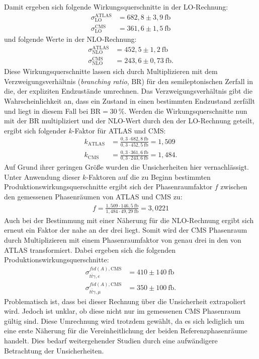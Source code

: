 Damit ergeben sich folgende Wirkungsquerschnitte in der LO-Rechnung:
\begin{align}
  \sigma^{\text{ATLAS}}_{\text{LO}} &= 682,8 \pm 3,9~ \si{\femto\barn}\\
  \sigma^{\text{CMS}}_{\text{LO}} &= 361,6 \pm 1,5~ \si{\femto\barn}
\end{align}
und folgende Werte in der NLO-Rechnung:
\begin{align}
  \sigma^{\text{ATLAS}}_{\text{NLO}} &= 452,5 \pm 1,2~ \si{\femto\barn}\\
  \sigma^{\text{CMS}}_{\text{NLO}} &= 243,6 \pm 0,73~ \si{\femto\barn}.
\end{align}
Diese Wirkungsquerschnitte lassen sich durch Multiplizieren mit dem Verzweigungsverhältnis (\textit{branching ratio}, $\mathrm{BR}$) für den semileptonischen Zerfall in die, der expliziten Endzustände umrechnen. Das Verzweigungsverhältnis gibt die Wahrscheinlichkeit an, dass ein Zustand in einen bestimmten Endzustand zerfällt und liegt in diesem Fall bei $\mathrm{BR}=\SI{30}{\percent}$. Werden die Wirkungsquerschnitte nun mit der $\mathrm{BR}$ multipliziert und der NLO-Wert durch den der LO-Rechnung geteilt, ergibt sich folgender $k$-Faktor für ATLAS und CMS:
\begin{align}
  k_{\text{ATLAS}} &= \frac{0,3 \cdot 682,8~ \si{\femto\barn}}{0,3 \cdot 452,5~ \si{\femto\barn}} = 1,509\\
  k_{\text{CMS}} &= \frac{0,3 \cdot 361,6~ \si{\femto\barn}}{0,3 \cdot 243,6~ \si{\femto\barn}} = 1,484.
\end{align}
Auf Grund ihrer geringen Größe wurden die Unsicherheiten hier vernachlässigt. Unter Anwendung dieser $k$-Faktoren auf die zu Beginn bestimmten Produktionswirkungsquerschnitte ergibt sich der Phasenraumfaktor $f$ zwischen den gemessenen Phasenräumen von ATLAS und CMS zu:
\begin{align}
  f = \frac{1,509 \cdot 146,5~ \si{\femto\barn}}{1,484 \cdot 49,29~ \si{\femto\barn}} = 3,0221
\end{align}
Auch bei der Bestimmung mit einer Näherung für die NLO-Rechnung ergibt sich erneut ein Faktor der nahe an der drei liegt. Somit wird der CMS Phasenraum durch Multiplizieren mit einem Phasenraumfaktor von genau drei in den von ATLAS transformiert. Dabei ergeben sich die folgenden Produktionswirkungsquerschnitte:
\begin{align}
  \sigma^{fid(A), \text{CMS}}_{t\bar{t}\gamma, e} &= 410 \pm 140~ \si{\femto\barn}\\
  \sigma^{fid(A), \text{CMS}}_{t\bar{t}\gamma, \mu} &= 350 \pm 100~ \si{\femto\barn}.
\end{align}
Problematisch ist, dass bei dieser Rechnung über die Unsicherheit extrapoliert wird. Jedoch ist unklar, ob diese nicht nur im gemessenen CMS Phasenraum gültig sind. Diese Umrechnung wird trotzdem gewählt, da es sich lediglich um eine erste Näherung für die Vereinheitlichung der beiden Referenzphasenräume handelt. Dies bedarf weitergehender Studien durch eine aufwändigere Betrachtung der Unsicherheiten.
%
%
